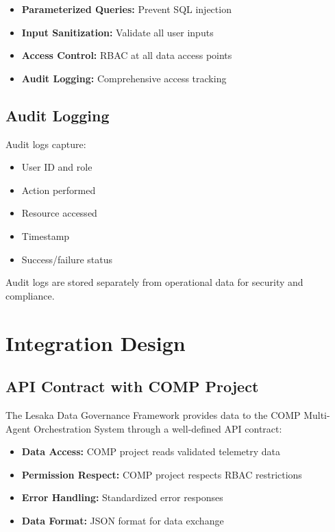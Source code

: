 \begin{itemize}
    \item \textbf{Parameterized Queries:} Prevent SQL injection
    \item \textbf{Input Sanitization:} Validate all user inputs
    \item \textbf{Access Control:} RBAC at all data access points
    \item \textbf{Audit Logging:} Comprehensive access tracking
\end{itemize}

\subsection{Audit Logging}

Audit logs capture:

\begin{itemize}
    \item User ID and role
    \item Action performed
    \item Resource accessed
    \item Timestamp
    \item Success/failure status
\end{itemize}

Audit logs are stored separately from operational data for security and compliance.

\section{Integration Design}

\subsection{API Contract with COMP Project}

The Lesaka Data Governance Framework provides data to the COMP Multi-Agent Orchestration System through a well-defined API contract:

\begin{itemize}
    \item \textbf{Data Access:} COMP project reads validated telemetry data
    \item \textbf{Permission Respect:} COMP project respects RBAC restrictions
    \item \textbf{Error Handling:} Standardized error responses
    \item \textbf{Data Format:} JSON format for data exchange
\end{itemize}

